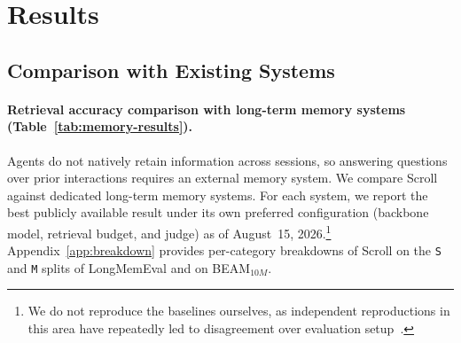 \section{Results}
\label{sec:results}

\subsection{Comparison with Existing Systems}
\label{sec:results-main}

\paragraph{Retrieval accuracy comparison with long-term memory systems
(Table~\ref{tab:memory-results}).}
Agents do not natively retain information across sessions, so answering questions over prior interactions requires an external memory system. 
We compare Scroll against dedicated long-term memory systems. For each system, we report the best publicly available result under its own preferred configuration (backbone model, retrieval budget, and judge) as of August~15, 2026.\footnote{We do not reproduce the baselines ourselves, as independent reproductions in this area have repeatedly led to disagreement over evaluation setup~\citep{zep-locomo-blog, mem0-zep-issue}.} 
Appendix~\ref{app:breakdown} provides per-category breakdowns of Scroll on the \texttt{S} and \texttt{M} splits of LongMemEval and on BEAM$_{10M}$.


